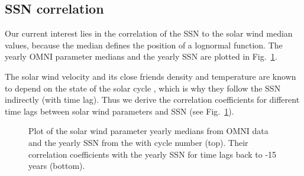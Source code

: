 \subsection{SSN correlation}
Our current interest lies in the correlation of the SSN to the solar wind median values, because the median defines the position of a lognormal function. The yearly OMNI parameter medians and the yearly SSN are plotted in Fig.~\ref{fig:OMNI_yearly_ssn_correlation_c_plot}.

The solar wind velocity and its close friends density and temperature are known to depend on the state of the solar cycle \citep{Schwenn1983}, which is why they follow the SSN indirectly (with time lag).
Thus we derive the correlation coefficients for different time lags between solar wind parameters and SSN (see Fig.~\ref{fig:OMNI_yearly_ssn_correlation_c_plot}).
\begin{figure}
	\caption{Plot of the solar wind parameter yearly medians from OMNI data and the yearly SSN from the \citet{sidc} with cycle number (top). Their correlation coefficients with the yearly SSN for time lags back to -15 years (bottom).}
	\label{fig:OMNI_yearly_ssn_correlation_c_plot}
\end{figure}

